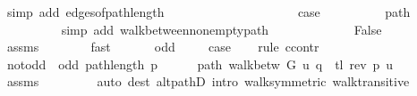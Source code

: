 \begin{isabellebody}
\ {\isacharparenleft}{\kern0pt}simp\ add{\isacharcolon}{\kern0pt}\ edges{\isacharunderscore}{\kern0pt}of{\isacharunderscore}{\kern0pt}path{\isacharunderscore}{\kern0pt}length{\isacharparenright}{\kern0pt}\isanewline
\ \ \ \ \isamarkupfalse%
\isanewline
\ \ \ \ \ \ \isamarkupfalse%
\ {}\isanewline
\ \ \ \ \ \ \isamarkupfalse%
\ {\isacharquery}{\kern0pt}case\isanewline
\ \ \ \ \ \ \ \ \isamarkupfalse%
\ path\isanewline
\ \ \ \ \ \ \ \ \isamarkupfalse%
\ {\isacharparenleft}{\kern0pt}simp\ add{\isacharcolon}{\kern0pt}\ walk{\isacharunderscore}{\kern0pt}between{\isacharunderscore}{\kern0pt}nonempty{\isacharunderscore}{\kern0pt}path{\isacharparenleft}{\kern0pt}{}{\isacharcomma}{\kern0pt}\ {}{\isacharparenright}{\kern0pt}{\isacharparenright}{\kern0pt}\isanewline
\ \ \ \ \isamarkupfalse%
\isanewline
\ \ \ \ \isamarkupfalse%
\ \isamarkupfalse%
\ False\isanewline
\ \ \ \ \ \ \isamarkupfalse%
\ assms{\isacharparenleft}{\kern0pt}{}{\isacharparenright}{\kern0pt}\isanewline
\ \ \ \ \ \ \isamarkupfalse%
\ fast\isanewline
\ \ \isamarkupfalse%
\isanewline
{}\isamarkupfalse%
\isanewline
\ \ \isamarkupfalse%
\ odd{\isacharcolon}{\kern0pt}\ {}\isanewline
\ \ \isamarkupfalse%
\ {\isacharquery}{\kern0pt}case\isanewline
\ \ \isamarkupfalse%
\ {\isacharparenleft}{\kern0pt}rule\ ccontr{\isacharparenright}{\kern0pt}\isanewline
\ \ \isamarkupfalse%
\ not{\isacharunderscore}{\kern0pt}odd{\isacharcolon}{\kern0pt}\ {\isachardoublequoteopen}{\isasymnot}\ odd\ {\isacharparenleft}{\kern0pt}path{\isacharunderscore}{\kern0pt}length\ p{\isacharparenright}{\kern0pt}{\isachardoublequoteclose}\isanewline
\ \ \ \ \isamarkupfalse%
\ path{\isacharcolon}{\kern0pt}\ {\isachardoublequoteopen}walk{\isacharunderscore}{\kern0pt}betw\ G\ u\ {\isacharparenleft}{\kern0pt}q\ {\isacharat}{\kern0pt}\ tl\ {\isacharparenleft}{\kern0pt}rev\ p{\isacharparenright}{\kern0pt}{\isacharparenright}{\kern0pt}\ u{\isachardoublequoteclose}\isanewline
\ \ \ \ \ \ \isamarkupfalse%
\ assms{\isacharparenleft}{\kern0pt}{}{\isacharcomma}{\kern0pt}\ {}{\isacharparenright}{\kern0pt}\isanewline
\ \ \ \ \ \ \isamarkupfalse%
\ {\isacharparenleft}{\kern0pt}auto\ dest{\isacharcolon}{\kern0pt}\ alt{\isacharunderscore}{\kern0pt}pathD{\isacharparenleft}{\kern0pt}{}{\isacharparenright}{\kern0pt}\ intro{\isacharcolon}{\kern0pt}\ walk{\isacharunderscore}{\kern0pt}symmetric\ walk{\isacharunderscore}{\kern0pt}transitive{\isacharparenright}{\kern0pt}\isanewline

\end{isabellebody}
